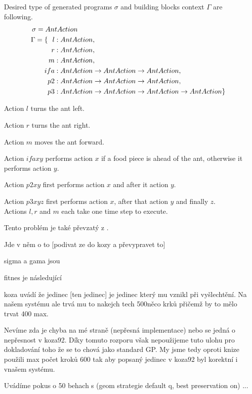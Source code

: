 \documentclass[12pt,a4paper]{report}
\begin{document}
Desired type of generated programs $\sigma$ and 
building blocks context $\Gamma$ are following.
\begin{align*}
\sigma = An&tAction\\
\Gamma = \{~~
  l    &: AntAction                              ,\\
  r    &: AntAction                              ,\\
  m    &: AntAction                              ,\\
  ifa  &: AntAction \rightarrow AntAction \rightarrow AntAction  ,\\
  p2   &: AntAction \rightarrow AntAction \rightarrow AntAction  ,\\
  p3   &: AntAction \rightarrow AntAction \rightarrow AntAction \rightarrow AntAction  \}
\end{align*}

Action $l$ turns the ant left.

Action $r$ turns the ant right.

Action $m$ moves the ant forward.

Action $ifa x y$ performs action $x$ if a food piece is ahead of the ant,
otherwise it performs action $y$.

Action $p2 x y$ first performs action $x$ and after it action $y$.

Action $p3 x y z$ first performs action $x$, after that action $y$ and finally $z$.\\



Actions $l, r$ and $m$ each take one time step to execute.





Tento problém je také převzatý z \cite{koza92}. 

Jde v něm o to [podivat ze do kozy a převypravet to]

sigma a gama jsou

fitnes je následující

koza uvádí že jedinec [ten jedinec] je jedinec který mu vznikl
při vyšlechtění. Na našem systému ale trvá mu to nakejch tech 500něco
krků přičemž by to mělo trvat 400 max. 

Nevíme zda je chyba na mé straně (nepřesná implementace) nebo
se jedná o nepřesnost v koza92. Díky tomuto rozporu však nepoužijeme
tuto ulohu pro dokladování toho že se to chová jako 
standard GP. My jsme tedy oproti knize použili max počet kroků 600
tak aby popsaný jedinec v koza92 byl korektní i vnašem systému.

Uvádíme pokus o 50 behach s (geom strategie default q, best preservation on)
...
\end{document}
